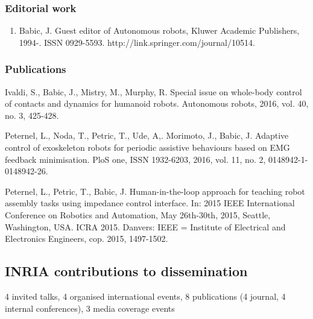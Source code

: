 \subsubsection{Editorial work}

\begin{enumerate}
	
\item Babic, J. Guest editor of Autonomous robots, Kluwer Academic Publishers, 1994-. ISSN 0929-5593. http://link.springer.com/journal/10514.

\end{enumerate}

\subsubsection{Publications}

Ivaldi, S., Babic, J., Mistry, M., Murphy, R. Special issue on whole-body control of contacts and dynamics for humanoid robots. Autonomous robots, 2016, vol. 40, no. 3, 425-428.
 
Peternel, L., Noda, T., Petric, T., Ude, A,. Morimoto, J., Babic, J. Adaptive control of exoskeleton robots for periodic assistive behaviours based on EMG feedback minimisation. PloS one, ISSN 1932-6203, 2016, vol. 11, no. 2, 0148942-1-0148942-26.

Peternel, L., Petric, T., Babic, J. Human-in-the-loop approach for teaching robot assembly tasks using impedance control interface. In: 2015 IEEE International Conference on Robotics and Automation, May 26th-30th, 2015, Seattle, Washington, USA. ICRA 2015. Danvers: IEEE = Institute of Electrical and Electronics Engineers, cop. 2015, 1497-1502.

\subsection{INRIA contributions to dissemination}

4 invited talks, 4 organised international events, 8 publications (4 journal, 4 internal conferences), 3 media coverage events

